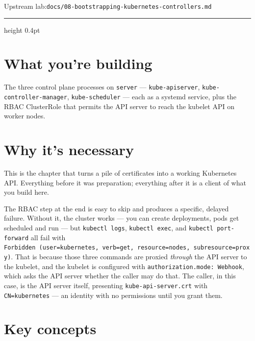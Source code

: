 \documentclass[11pt,oneside]{report}
\newcommand{\upstreamlab}[1]{%
  {\sffamily\footnotesize\color{steel}Upstream lab:\quad\texttt{#1}}\par\vspace{2pt}%
  {\color{rule}\hrule height 0.4pt}\vspace{8pt}}
\begin{document}
\upstreamlab{docs/08-bootstrapping-kubernetes-controllers.md}

\hypertarget{what-youre-building-8}{%
\section{What you're
building}\label{what-youre-building-8}}

The three control
plane processes on
\texttt{server} ---
\texttt{kube-apiserver},
\texttt{kube-}\allowbreak{}\texttt{controller-}\allowbreak{}\texttt{manager},
\texttt{kube-scheduler}
--- each as a
systemd service,
plus the RBAC
ClusterRole that
permits the API
server to reach the
kubelet API on
worker nodes.

\hypertarget{why-its-necessary-8}{%
\section{Why it's
necessary}\label{why-its-necessary-8}}

\begin{whybox}

This is the chapter
that turns a pile of
certificates into a
working Kubernetes
API. Everything
before it was
preparation;
everything after it
is a client of what
you build here.

\end{whybox}

The RBAC step at the
end is easy to skip
and produces a
specific, delayed
failure. Without it,
the cluster works
--- you can create
deployments, pods
get scheduled and
run --- but
\texttt{kubectl\ logs},
\texttt{kubectl\ exec},
and
\texttt{kubectl\ port-}\allowbreak{}\texttt{forward}
all fail with
\texttt{Forbidden\ (user=kubernetes,\ verb=get,\ resource=nodes,\ subresource=proxy)}.
That is because
those three commands
are proxied
\emph{through} the
API server to the
kubelet, and the
kubelet is
configured with
\texttt{authorization.}\allowbreak{}\texttt{mode:}\allowbreak{}\texttt{\ Webhook},
which asks the API
server whether the
caller may do that.
The caller, in this
case, is the API
server itself,
presenting
\texttt{kube-}\allowbreak{}\texttt{api-}\allowbreak{}\texttt{server.}\allowbreak{}\texttt{crt}
with
\texttt{CN=kubernetes}
--- an identity with
no permissions until
you grant them.

\hypertarget{key-concepts-8}{%
\section{Key
concepts}\label{key-concepts-8}}
\end{document}
